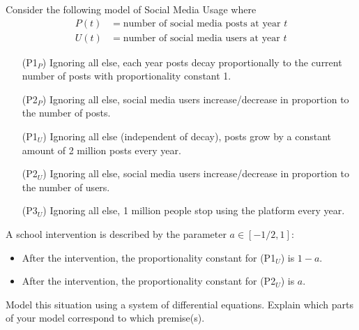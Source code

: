 \documentclass{workbook}
\begin{document}
\begin{slide}
	\question
	Consider the following model of Social Media Usage where
	\begin{align*}
		P(t) &= \text{number of social media posts at year $t$}\\
		U(t) &= \text{number of social media users at year $t$}
	\end{align*}
	\begin{itemize}
		\item[(P1$_P$)] Ignoring all else, each year posts decay proportionally to the current number of posts with proportionality constant 1.
		\item[(P2$_P$)] Ignoring all else, social media users increase/decrease in proportion to the number of posts.
		\item[(P1$_U$)] Ignoring all else (independent of decay), posts grow by a constant amount of 2 million posts every year.
		\item[(P2$_U$)] Ignoring all else, social media users increase/decrease in proportion to the number of users.
		\item[(P3$_U$)] Ignoring all else, 1 million people stop using the platform every year.
	\end{itemize}

	\bigskip
	A school intervention is described by the parameter $a\in [-1/2, 1]$:
	\begin{itemize}
		\item After the intervention, the proportionality constant for (P1$_U$) is $1-a$.
		\item After the intervention, the proportionality constant for (P2$_U$) is $a$.
	\end{itemize}

	\begin{parts}
		\item Model this situation using a system of differential equations. Explain
			which parts of your model correspond to which premise(s).
	\end{parts}
\end{slide}
\end{document}
